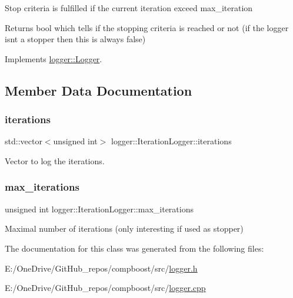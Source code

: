 Stop criteria is fulfilled if the current iteration exceed {\ttfamily max\+\_\+iteration} 

\begin{DoxyReturn}{Returns}
{\ttfamily bool} which tells if the stopping criteria is reached or not (if the logger isn\textquotesingle{}t a stopper then this is always false) 
\end{DoxyReturn}


Implements \mbox{\hyperlink{classlogger_1_1_logger_aed91421c07062b91cee158ef2bda7ae8}{logger\+::\+Logger}}.



\subsection{Member Data Documentation}
\mbox{\label{classlogger_1_1_iteration_logger_a7c9d7b0bd792a93a6dd5d9601a10a9b4}} 
\subsubsection{\texorpdfstring{iterations}{iterations}}
{\footnotesize\ttfamily std\+::vector$<$unsigned int$>$ logger\+::\+Iteration\+Logger\+::iterations\hspace{0.3cm}{\ttfamily [private]}}



Vector to log the iterations. 

\mbox{\label{classlogger_1_1_iteration_logger_a3fe389ce81d0790729b59b96414a3909}} 
\subsubsection{\texorpdfstring{max\+\_\+iterations}{max\_iterations}}
{\footnotesize\ttfamily unsigned int logger\+::\+Iteration\+Logger\+::max\+\_\+iterations\hspace{0.3cm}{\ttfamily [private]}}



Maximal number of iterations (only interesting if used as stopper) 



The documentation for this class was generated from the following files\+:\begin{DoxyCompactItemize}
\item 
E\+:/\+One\+Drive/\+Git\+Hub\+\_\+repos/compboost/src/\mbox{\hyperlink{logger_8h}{logger.\+h}}\item 
E\+:/\+One\+Drive/\+Git\+Hub\+\_\+repos/compboost/src/\mbox{\hyperlink{logger_8cpp}{logger.\+cpp}}\end{DoxyCompactItemize}
